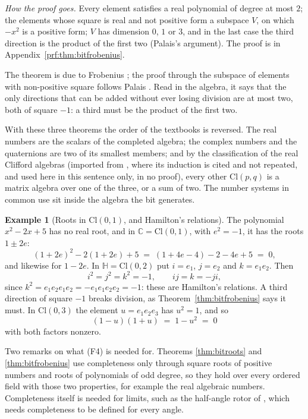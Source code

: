 \documentclass[11pt]{article}
\theoremstyle{plain}
\theoremstyle{definition}
\newtheorem{example}{Example}
\theoremstyle{plain}
\theoremstyle{definition}
\newcommand{\Cl}{\mathrm{Cl}}
\newcommand{\C}{\mathbb{C}}
\newcommand{\HH}{\mathbb{H}}
\begin{document}
\noindent\emph{How the proof goes.} Every element satisfies a real polynomial of degree at most $2$; the elements whose square is real and not positive form a subspace $V$, on which $-x^{2}$ is a positive form; $V$ has dimension $0$, $1$ or $3$, and in the last case the third direction is the product of the first two (Palais's argument). The proof is in Appendix~\ref{prf:thm:bitfrobenius}.

The theorem is due to Frobenius \cite{Frobenius1878}; the proof through the subspace of elements with non-positive square follows Palais \cite{Palais1968}. Read in the algebra, it says that the only directions that can be added without ever losing division are at most two, both of square $-1$: a third must be the product of the first two.

With these three theorems the order of the textbooks is reversed. The real numbers are the scalars of the completed algebra; the complex numbers and the quaternions are two of its smallest members; and by the classification of the real Clifford algebras (imported from \cite[Theorem 9.3]{ButlerT0}, where its induction is cited and not repeated, and used here in this sentence only, in no proof), every other $\Cl(p,q)$ is a matrix algebra over one of the three, or a sum of two. The number systems in common use sit inside the algebra the bit generates.

\begin{example}[Roots in $\Cl(0,1)$, and Hamilton's relations]\label{ex:roots}
The polynomial $x^{2} - 2x + 5$ has no real root, and in $\C = \Cl(0,1)$, with $e^{2} = -1$, it has the roots $1 \pm 2e$:
\[
(1 + 2e)^{2} - 2(1 + 2e) + 5 \;=\; (1 + 4e - 4) - 2 - 4e + 5 \;=\; 0 ,
\]
and likewise for $1 - 2e$. In $\HH = \Cl(0,2)$ put $i = e_{1}$, $j = e_{2}$ and $k = e_{1}e_{2}$. Then
\[
i^{2} = j^{2} = k^{2} = -1, \qquad ij = k = -ji ,
\]
since $k^{2} = e_{1}e_{2}e_{1}e_{2} = -e_{1}e_{1}e_{2}e_{2} = -1$: these are Hamilton's relations. A third direction of square $-1$ breaks division, as Theorem~\ref{thm:bitfrobenius} says it must. In $\Cl(0,3)$ the element $u = e_{1}e_{2}e_{3}$ has $u^{2} = 1$, and so
\[
(1 - u)(1 + u) \;=\; 1 - u^{2} \;=\; 0
\]
with both factors nonzero.
\end{example}


Two remarks on what (F4) is needed for. Theorems \ref{thm:bitroots} and \ref{thm:bitfrobenius} use completeness only through square roots of positive numbers and roots of polynomials of odd degree, so they hold over every ordered field with those two properties, for example the real algebraic numbers. Completeness itself is needed for limits, such as the half-angle rotor of \cite[Example 6.1]{ButlerT0}, which needs completeness to be defined for every angle.
\end{document}
